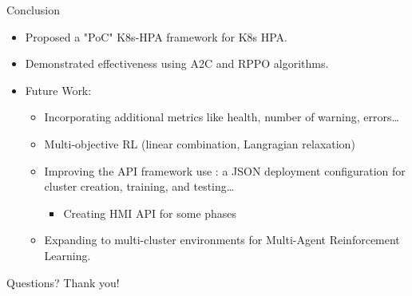 \documentclass{beamer}
\begin{document}
\begin{frame}{Conclusion}
    \begin{itemize}
        \item Proposed a "PoC" K8s-HPA framework for K8s HPA.
        \item Demonstrated effectiveness using A2C and RPPO algorithms.
        \item Future Work:
        \begin{itemize}
            \item Incorporating additional metrics like health, number of warning, errors\dots
            \item Multi-objective RL (linear combination, Langragian relaxation)
            \item Improving the API framework use : a JSON deployment configuration for cluster creation, training, and testing\dots
            \begin{itemize}
                \item Creating HMI API for some phases
            \end{itemize} 
            \item Expanding to multi-cluster environments for Multi-Agent Reinforcement Learning.
        \end{itemize}
    \end{itemize}
\end{frame}

\begin{frame}{Questions?}
    \centering
    Thank you! \\
\end{frame}
\end{document}

